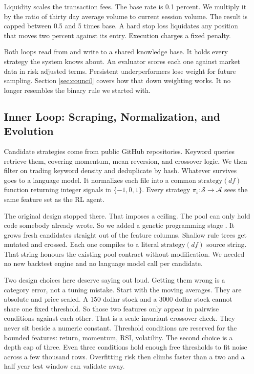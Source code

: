 \documentclass[conference]{IEEEtran}
\begin{document}
Liquidity scales the transaction fees. The base rate is 0.1 percent. We multiply it by the ratio of thirty day average volume to current session volume. The result is capped between 0.5 and 5 times base. A hard stop loss liquidates any position that moves two percent against its entry. Execution charges a fixed penalty.

Both loops read from and write to a shared knowledge base. It holds every strategy the system knows about. An evaluator scores each one against market data in risk adjusted terms. Persistent underperformers lose weight for future sampling. Section \ref{sec:council} covers how that down weighting works. It no longer resembles the binary rule we started with.

\subsection{Inner Loop: Scraping, Normalization, and Evolution}

Candidate strategies come from public GitHub repositories. Keyword queries retrieve them, covering momentum, mean reversion, and crossover logic. We then filter on trading keyword density and deduplicate by hash. Whatever survives goes to a language model. It normalizes each file into a common $\text{strategy}(df)$ function returning integer signals in $\{-1, 0, 1\}$. Every strategy $\pi_i : \mathcal{S} \rightarrow \mathcal{A}$ sees the same feature set as the RL agent.

The original design stopped there. That imposes a ceiling. The pool can only hold code somebody already wrote. So we added a genetic programming stage \cite{koza1992genetic}. It grows fresh candidates straight out of the feature columns. Shallow rule trees get mutated and crossed. Each one compiles to a literal $\text{strategy}(df)$ source string. That string honours the existing pool contract without modification. We needed no new backtest engine and no language model call per candidate.

Two design choices here deserve saying out loud. Getting them wrong is a category error, not a tuning mistake. Start with the moving averages. They are absolute and price scaled. A 150 dollar stock and a 3000 dollar stock cannot share one fixed threshold. So those two features only appear in pairwise conditions against each other. That is a scale invariant crossover check. They never sit beside a numeric constant. Threshold conditions are reserved for the bounded features: return, momentum, RSI, volatility. The second choice is a depth cap of three. Even three conditions hold enough free thresholds to fit noise across a few thousand rows. Overfitting risk then climbs faster than a two and a half year test window can validate away.
\end{document}
